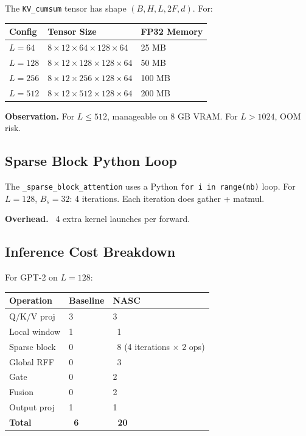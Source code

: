 The \texttt{KV\_cumsum} tensor has shape $(B, H, L, 2F, d)$. For:

\begin{table}[H]
\centering
\small
\begin{tabular}{lll}
\toprule
\textbf{Config} & \textbf{Tensor Size} & \textbf{FP32 Memory} \\
\midrule
$L=64$ & $8 \times 12 \times 64 \times 128 \times 64$ & 25 MB \\
$L=128$ & $8 \times 12 \times 128 \times 128 \times 64$ & 50 MB \\
$L=256$ & $8 \times 12 \times 256 \times 128 \times 64$ & 100 MB \\
$L=512$ & $8 \times 12 \times 512 \times 128 \times 64$ & 200 MB \\
\bottomrule
\end{tabular}
\end{table}

\textbf{Observation.} For $L \le 512$, manageable on 8 GB VRAM. For $L > 1024$, 
OOM risk.

\subsection{Sparse Block Python Loop}

The \texttt{\_sparse\_block\_attention} uses a Python \texttt{for i in range(nb)} loop. For 
$L = 128$, $B_s = 32$: 4 iterations. Each iteration does gather + matmul.

\textbf{Overhead.} ~4 extra kernel launches per forward.

\subsection{Inference Cost Breakdown}

For GPT-2 on $L = 128$:

\begin{table}[H]
\centering
\small
\begin{tabular}{lll}
\toprule
\textbf{Operation} & \textbf{Baseline} & \textbf{NASC} \\
\midrule
Q/K/V proj & 3 & 3 \\
Local window & 1 & ~1 \\
Sparse block & 0 & ~8 (4 iterations $\times$ 2 ops) \\
Global RFF & 0 & ~3 \\
Gate & 0 & 2 \\
Fusion & 0 & 2 \\
Output proj & 1 & 1 \\
\textbf{Total} & \textbf{~6} & \textbf{~20} \\
\bottomrule
\end{tabular}
\end{table}

